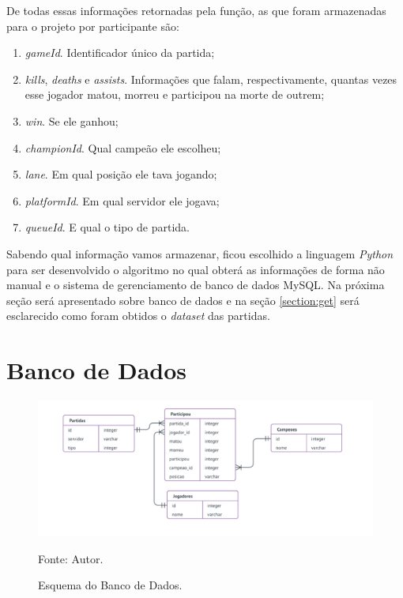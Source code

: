 De todas essas informações retornadas pela função, as que foram armazenadas para o projeto por participante são:

\begin{enumerate}
\item \textit{gameId}. Identificador único da partida;
\item \textit{kills}, \textit{deaths} e \textit{assists}. Informações que falam, respectivamente, quantas vezes esse jogador matou, morreu e participou na morte de outrem;
\item \textit{win}. Se ele ganhou;
\item \textit{championId}. Qual campeão ele escolheu;
\item \textit{lane}. Em qual posição ele tava jogando;
\item \textit{platformId}. Em qual servidor ele jogava;
\item \textit{queueId}. E qual o tipo de partida.
\end{enumerate}

Sabendo qual informação vamos armazenar, ficou escolhido a linguagem \textit{Python} para ser desenvolvido o algoritmo no qual obterá as informações de forma não manual e o sistema de gerenciamento de banco de dados MySQL. Na próxima seção será apresentado sobre banco de dados e na seção \ref{section:get} será esclarecido como foram obtidos o \textit{dataset} das partidas. 


\section{Banco de Dados}

\begin{figure}[H]
	\caption{Esquema do Banco de Dados.}
	\begin{center}
		\includegraphics[width=17cm]{imagens/esquema.png}
	\end{center}
	\small{Fonte: Autor.}
	\label{fig:novafigura}
\end{figure}


